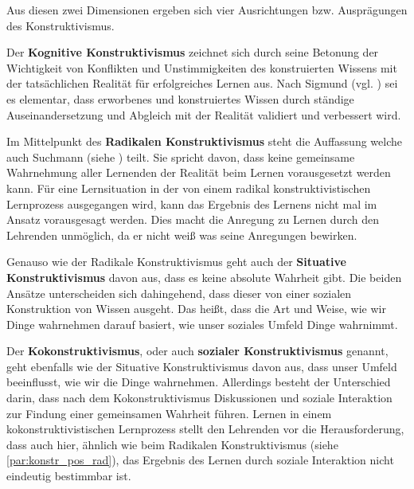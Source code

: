 Aus diesen zwei Dimensionen ergeben sich vier Ausrichtungen bzw. Ausprägungen des Konstruktivismus. 

Der \textbf{Kognitive Konstruktivismus} zeichnet sich durch seine Betonung der Wichtigkeit von Konflikten und Unstimmigkeiten des konstruierten Wissens mit der tatsächlichen Realität für erfolgreiches Lernen aus. Nach Sigmund (vgl. \cite{Tobias.1991}) sei es elementar, dass erworbenes und konstruiertes Wissen durch ständige Auseinandersetzung und Abgleich mit der Realität validiert und verbessert wird. 

Im Mittelpunkt des \textbf{Radikalen Konstruktivismus} \label{par:konstr_pos_rad} steht die Auffassung welche auch Suchmann (siehe \cite{Suchman.1987}) teilt. Sie spricht davon, dass keine gemeinsame Wahrnehmung aller Lernenden der Realität beim Lernen vorausgesetzt werden kann. Für eine Lernsituation in der von einem radikal konstruktivistischen Lernprozess ausgegangen wird, kann das Ergebnis des Lernens nicht mal im Ansatz vorausgesagt werden. Dies macht die Anregung zu Lernen durch den Lehrenden unmöglich, da er nicht weiß was seine Anregungen bewirken. \cite{Anderson.1999} %

Genauso wie der Radikale Konstruktivismus geht auch der \textbf{Situative Konstruktivismus} davon aus, dass es keine absolute Wahrheit gibt. \cite{Anderson.1999} Die beiden Ansätze unterscheiden sich dahingehend, dass dieser von einer sozialen Konstruktion von Wissen ausgeht. Das heißt, dass die Art und Weise, wie wir Dinge wahrnehmen darauf basiert, wie unser soziales Umfeld Dinge wahrnimmt. \cite{Jonassen.1992} %

Der \textbf{Kokonstruktivismus}, oder auch \textbf{sozialer Konstruktivismus} genannt, geht ebenfalls wie der Situative Konstruktivismus davon aus, dass unser Umfeld beeinflusst, wie wir die Dinge wahrnehmen. Allerdings besteht der Unterschied darin, dass nach dem Kokonstruktivismus Diskussionen und soziale Interaktion zur Findung einer gemeinsamen Wahrheit führen. \cite{Bereiter.1994} Lernen in einem kokonstruktivistischen Lernprozess stellt den Lehrenden vor die Herausforderung, dass auch hier, ähnlich wie beim Radikalen Konstruktivismus (siehe \ref{par:konstr_pos_rad}), das Ergebnis des Lernen durch soziale Interaktion nicht eindeutig bestimmbar ist. \cite{Anderson.1999} %

